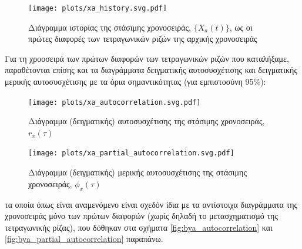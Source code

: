 \begin{figure}[H]
    \begin{center}
        \texttt{[image: plots/xa\_history.svg.pdf]}
        \caption{Διάγραμμα ιστορίας της στάσιμης χρονοσειράς, $\{X_a(t)\}$, ως οι πρώτες διαφορές των τετραγωνικών ριζών της αρχικής χρονοσειράς}
        \label{fig:xa_history}
    \end{center}
\end{figure}

Για τη χροοσειρά των πρώτων διαφορών των τετραγωνικών ριζών που καταλήξαμε, παραθέτονται επίσης και τα διαγράμματα δειγματικής αυτοσυσχέτισης και δειγματικής μερικής αυτοσυσχέτισης με τα όρια σημαντικότητας (για εμπιστοσύνη 95\%):

\begin{figure}[H]
    \begin{center}
        \texttt{[image: plots/xa\_autocorrelation.svg.pdf]}
        \caption{Διάγραμμα (δειγματικής) αυτοσυσχέτισης της στάσιμης χρονοσειράς, $r_x(\tau)$}
        \label{fig:xa_autocorrelation}
    \end{center}
\end{figure}

\begin{figure}[H]
    \begin{center}
        \texttt{[image: plots/xa\_partial\_autocorrelation.svg.pdf]}
        \caption{Διάγραμμα (δειγματικής) μερικής αυτοσυσχέτισης της στάσιμης χρονοσειράς, $\phi_x(\tau)$}
        \label{fig:xa_partial_autocorrelation}
    \end{center}
\end{figure}

τα οποία όπως είναι αναμενόμενο είναι σχεδόν ίδια με τα αντίστοιχα διαγράμματα της χρονοσειράς μόνο των πρώτων διαφορών (χωρίς δηλαδή το μετασχηματισμό της τετραγωνικής ρίζας), που δόθηκαν στα σχήματα \ref{fig:bya_autocorrelation} και \ref{fig:bya_partial_autocorrelation} παραπάνω.


